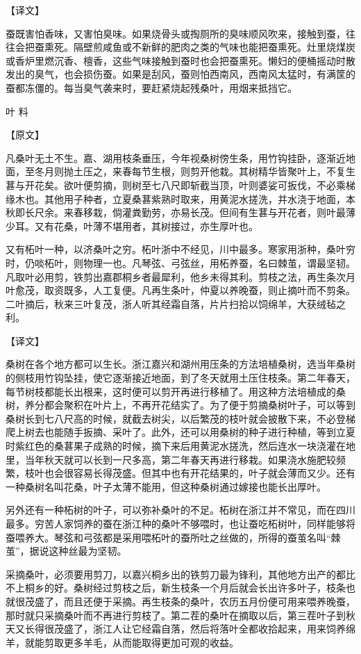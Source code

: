 \documentclass[12pt,UTF8]{ctexbook}
\begin{document}
【译文】

蚕既害怕香味，又害怕臭味。如果烧骨头或掏厕所的臭味顺风吹来，接触到蚕，往往会把蚕熏死。隔壁煎咸鱼或不新鲜的肥肉之类的气味也能把蚕熏死。灶里烧煤炭或香炉里燃沉香、檀香，这些气味接触到蚕时也会把蚕熏死。懒妇的便桶摇动时散发出的臭气，也会损伤蚕。如果是刮风，蚕则怕西南风，西南风太猛时，有满筐的蚕都冻僵的。每当臭气袭来时，要赶紧烧起残桑叶，用烟来抵挡它。

叶 料

【原文】

凡桑叶无土不生。嘉、湖用枝条垂压，今年视桑树傍生条，用竹钩挂卧，逐渐近地面，至冬月则抛土压之，来春每节生根，则剪开他栽。其树精华皆聚叶上，不复生葚与开花矣。欲叶便剪摘，则树至七八尺即斩截当顶，叶则婆娑可扳伐，不必乘梯缘木也。其他用子种者，立夏桑葚紫熟时取来，用黄泥水搓洗，并水浇于地面，本秋即长尺余。来春移栽，倘灌粪勤劳，亦易长茂。但间有生葚与开花者，则叶最薄少耳。又有花桑，叶薄不堪用者，其树接过，亦生厚叶也。

又有柘叶一种，以济桑叶之穷。柘叶浙中不经见，川中最多。寒家用浙种，桑叶穷时，仍啖柘叶，则物理一也。凡琴弦、弓弦丝，用柘养蚕，名曰棘茧，谓最坚韧。凡取叶必用剪，铁剪出嘉郡桐乡者最犀利，他乡未得其利。剪枝之法，再生条次月叶愈茂，取资既多，人工复便。凡再生条叶，仲夏以养晚蚕，则止摘叶而不剪条。二叶摘后，秋来三叶复茂，浙人听其经霜自落，片片扫拾以饲绵羊，大获绒毡之利。

【译文】

桑树在各个地方都可以生长。浙江嘉兴和湖州用压条的方法培植桑树，选当年桑树的侧枝用竹钩坠挂，使它逐渐接近地面，到了冬天就用土压住枝条。第二年春天，每节树枝都能长出根来，这时便可以剪开再进行移植了。用这种方法培植成的桑树，养分都会聚积在叶片上，不再开花结实了。为了便于剪摘桑树叶子，可以等到桑树长到七八尺高的时候，就截去树尖，以后繁茂的枝叶就会披散下来，不必登梯爬上树去也能随手扳摘、采叶了。此外，还可以用桑树的种子进行种植，等到立夏时紫红色的桑葚果子成熟的时候，摘下来后用黄泥水搓洗，然后连水一块浇灌在地里，当年秋天就可以长到一尺多高，第二年春天再进行移栽。如果浇水施肥较频繁，枝叶也会很容易长得茂盛。但其中也有开花结果的，叶子就会薄而又少。还有一种桑树名叫花桑，叶子太薄不能用，但这种桑树通过嫁接也能长出厚叶。

另外还有一种柘树的叶子，可以弥补桑叶的不足。柘树在浙江并不常见，而在四川最多。穷苦人家饲养的蚕在浙江种的桑叶不够喂时，也让蚕吃柘树叶，同样能够将蚕喂养大。琴弦和弓弦都是采用喂柘叶的蚕所吐之丝做的，所得的蚕茧名叫“棘茧”，据说这种丝最为坚韧。

采摘桑叶，必须要用剪刀，以嘉兴桐乡出的铁剪刀最为锋利，其他地方出产的都比不上桐乡的好。桑树经过剪枝之后，新生枝条一个月后就会长出许多叶子，枝条也就很茂盛了，而且还便于采摘。再生枝条的桑叶，农历五月份便可用来喂养晚蚕，那时就只采摘桑叶而不再进行剪枝了。第二茬的桑叶在摘取以后，第三茬叶子到秋天又长得很茂盛了，浙江人让它经霜自落，然后将落叶全都收拾起来，用来饲养绵羊，就能剪取更多羊毛，从而能取得更加可观的收益。
\end{document}
